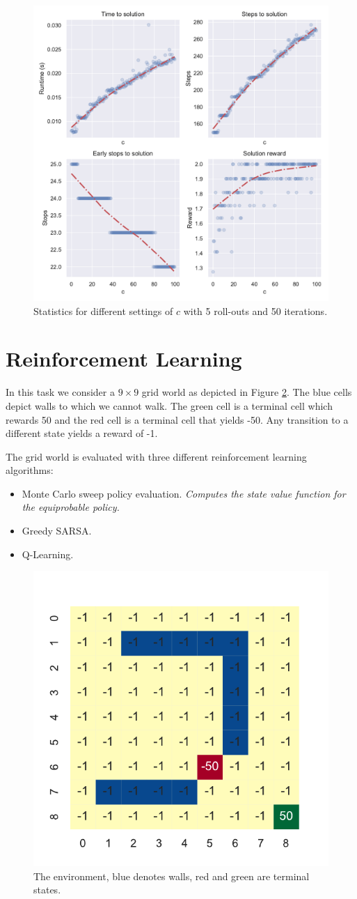 \documentclass[]{scrartcl}
\begin{document}
\begin{figure}[H]
	\centering
	\includegraphics[width=0.7\linewidth]{2-1.pdf}
	\caption{Statistics for different settings of $c$ with 5 roll-outs and 50 iterations.}
	\label{fig:2-1}
\end{figure}


\section{Reinforcement Learning}

In this task we consider a $9\times9$ grid world as depicted in Figure \ref{fig:3-0}. The blue cells depict walls to which we cannot walk. The green cell is a terminal cell which rewards 50 and the red cell is a terminal cell that yields -50. Any transition to a different state yields a reward of -1.

The grid world is evaluated with three different reinforcement learning algorithms:

\begin{itemize}
	\item Monte Carlo sweep policy evaluation. \textit{Computes the state value function for the equiprobable policy.}
	\item Greedy SARSA.
	\item Q-Learning.
\end{itemize}

\begin{figure}[H]
	\centering
	\includegraphics[width=0.4\linewidth]{3-0.pdf}
	\caption{The environment, blue denotes walls, red and green are terminal states.}
	\label{fig:3-0}
\end{figure}
\end{document}
